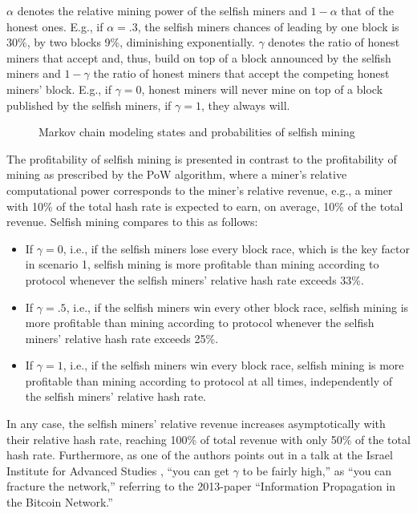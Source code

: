 $\alpha$ denotes the relative mining power of the selfish miners and $1 - \alpha$ that of the honest ones.
E.g., if $\alpha = .3$, the selfish miners chances of  leading by one block is 30\%, by two blocks 9\%, diminishing exponentially.
$\gamma$ denotes the ratio of honest miners that accept and, thus, build on top of a block announced by the selfish miners and $1 - \gamma$ the ratio of honest miners that accept the competing honest miners' block.
E.g., if $\gamma = 0$, honest miners will never mine on top of a block published by the selfish miners, if $\gamma = 1$, they always will.
\\
\begin{figure}[H]
\centering

\caption*{
  Markov chain modeling states and probabilities of selfish mining \autocite[8]{eyal2014}
}
\end{figure}

The profitability of selfish mining is presented in contrast to the profitability of mining as prescribed by the PoW algorithm, where a miner's relative computational power corresponds to the miner's relative revenue, e.g., a miner with 10\% of the total hash rate is expected to earn, on average, 10\% of the total revenue.
Selfish mining compares to this as follows:

\begin{itemize}
\item
If $\gamma = 0$, i.e., if the selfish miners lose every block race, which is the key factor in scenario 1, selfish mining is more profitable than mining according to protocol whenever the selfish miners' relative hash rate exceeds 33\%.
\item
If $\gamma = .5$, i.e., if the selfish miners win every other block race, selfish mining is more profitable than mining according to protocol whenever the selfish miners' relative hash rate exceeds 25\%.
\item
If $\gamma = 1$, i.e., if the selfish miners win every block race, selfish mining is more profitable than mining according to protocol at all times, independently of the selfish miners' relative hash rate.
\end{itemize}

In any case, the selfish miners' relative revenue increases asymptotically with their relative hash rate, reaching 100\% of total revenue with only 50\% of the total hash rate.
Furthermore, as one of the authors points out in a talk at the Israel Institute for Advanced Studies \autocite{youtube2018alttonakamotoconsensus}, ``you can get $\gamma$ to be fairly high,'' as ``you can fracture the network,'' referring to the 2013-paper ``Information Propagation in the Bitcoin Network.'' \autocite{decker2013}

